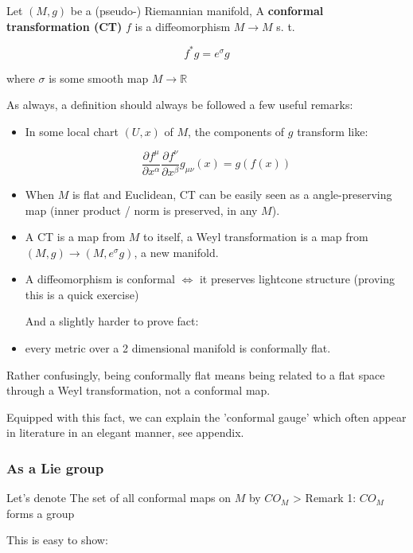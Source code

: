 \begin{defn}
Let $(M, g)$ be a (pseudo-) Riemannian manifold, A \textbf{conformal transformation (CT)}  $f$ is a diffeomorphism $M \to M$ s. t.

    $$f^*g = e^{\sigma}g$$

    where $\sigma$ is some smooth map $M \to \mathbb{R}$

\end{defn}

As always, a definition should always be followed a few useful remarks:


\begin{itemize}
\item In some local chart $(U, x)$ of $M$, the components of $g$ transform like:

$$\frac{\partial f ^\mu}{\partial x^\alpha}\frac{\partial f ^\nu}{\partial x^\beta} g_{\mu\nu} (x) = g(f(x))$$


\item When $M$ is flat and Euclidean, CT can be easily seen as a angle-preserving map (inner product / norm is preserved, in any $M$).
\item A CT is a map from $M$ to itself, a Weyl transformation is a map from $(M, g) \to (M, e^\sigma g)$, a new manifold.
\item A diffeomorphism is conformal $\iff$ it preserves lightcone structure (proving this is a quick exercise)



And a slightly harder to prove fact:

\item every metric over a 2 dimensional manifold is conformally flat.


\end{itemize}

Rather confusingly, being conformally flat means being related to a flat space through a Weyl transformation, not a conformal map.

Equipped with this fact, we can explain the 'conformal gauge' which often appear in literature in an elegant manner, see appendix.

\subsubsection{ As a Lie group}

Let's denote The set of all conformal maps on $M$  by $CO_M$
> Remark 1: $CO_M$ forms a group

This is easy to show:

